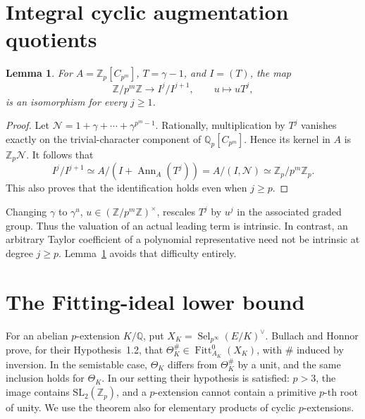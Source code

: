 \documentclass[11pt]{article}
\newtheorem{lemma}[theorem]{Lemma}
\theoremstyle{remark}\newtheorem{remark}[theorem]{Remark}
\newcommand{\Z}{\mathbb Z}\newcommand{\Q}{\mathbb Q}\newcommand{\F}{\mathbb F}
\newcommand{\Sel}{\operatorname{Sel}}
\newcommand{\Fitt}{\operatorname{Fitt}}
\begin{document}
\section{Integral cyclic augmentation quotients}
\begin{lemma}\label{cycliclemma}
For $A=\Z_p[C_{p^m}]$, $T=\gamma-1$, and $I=(T)$, the map
\[
 \Z/p^m\Z\longrightarrow I^j/I^{j+1},\qquad u\longmapsto uT^j,
\]
is an isomorphism for every $j\geq1$.
\end{lemma}
\begin{proof}
Let $\mathcal N=1+\gamma+\cdots+\gamma^{p^m-1}$. Rationally, multiplication by $T^j$ vanishes exactly on the trivial-character component of $\Q_p[C_{p^m}]$. Hence its kernel in $A$ is $\Z_p\mathcal N$. It follows that
\[
 I^j/I^{j+1}\simeq A/(I+\operatorname{Ann}_A(T^j))
 = A/(I,\mathcal N)\simeq\Z_p/p^m\Z_p.
\]
This also proves that the identification holds even when $j\geq p$.
\end{proof}
Changing $\gamma$ to $\gamma^u$, $u\in(\Z/p^m\Z)^\times$, rescales $T^j$ by $u^j$ in the associated graded group. Thus the valuation of an actual leading term is intrinsic. In contrast, an arbitrary Taylor coefficient of a polynomial representative need not be intrinsic at degree $j\geq p$. Lemma~\ref{cycliclemma} avoids that difficulty entirely.

\section{The Fitting-ideal lower bound}
For an abelian $p$-extension $K/\Q$, put $X_K=\Sel_{p^\infty}(E/K)^\vee$. Bullach and Honnor \cite[Thm.~1.4(b), Rem.~1.5(a)]{BH} prove, for their Hypothesis~1.2, that $\Theta_K^\#\in\Fitt^0_{A_K}(X_K)$, with $\#$ induced by inversion. In the semistable case, $\Theta_K$ differs from $\Theta_K^\#$ by a unit, and the same inclusion holds for $\Theta_K$. In our setting their hypothesis is satisfied: $p>3$, the image contains $\mathrm{SL}_2(\Z_p)$, and a $p$-extension cannot contain a primitive $p$-th root of unity. We use the theorem also for elementary products of cyclic $p$-extensions.
\end{document}
